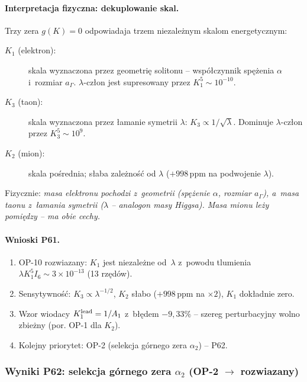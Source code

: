 \paragraph{Interpretacja fizyczna: dekuplowanie skal.}
Trzy zera $g(K)=0$ odpowiadaja trzem niezale\.znym skalom energetycznym:
\begin{description}
  \item[$K_1$ (elektron):] skala wyznaczona przez geometri\k{e} solitonu --
    wsp\'o\l{}czynnik sp\k{e}\.zenia $\alpha$ i~rozmiar $a_\Gamma$.
    $\lambda$-cz\l{}on jest supresowany przez $K_1^5\sim10^{-10}$.
  \item[$K_3$ (taon):] skala wyznaczona przez \l{}amanie symetrii $\lambda$:
    $K_3\propto1/\sqrt{\lambda}$.
    Dominuje $\lambda$-cz\l{}on przez $K_3^5\sim10^9$.
  \item[$K_2$ (mion):] skala po\'srednia;
    s\l{}aba zale\.zno\'s\'c od $\lambda$ ($+998\,\mathrm{ppm}$ na
    podwojenie $\lambda$).
\end{description}
Fizycznie: \emph{masa elektronu pochodzi z~geometrii (sp\k{e}\.zenie
$\alpha$, rozmiar $a_\Gamma$), a~masa taonu z~\l{}amania symetrii
($\lambda$ -- analogon masy Higgsa).
Masa mionu le\.zy pomi\k{e}dzy -- ma obie cechy.}

\paragraph{Wnioski P61.}
\begin{enumerate}
  \item OP-10 rozwiazany: $K_1$ jest niezale\.zne od~$\lambda$
        z~powodu tlumienia $\lambda K_1^5 I_6 \sim 3\times10^{-13}$
        (13 rz\k{e}d\'ow).
  \item Sensytywno\'s\'c: $K_3\propto\lambda^{-1/2}$,
        $K_2$ s\l{}abo ($+998\,\mathrm{ppm}$ na $\times2$),
        $K_1$ dok\l{}adnie zero.
  \item Wzor wiodacy $K_1^{\rm lead}=1/A_1$ z~b\l{}\k{e}dem $-9{,}33\%$ --
        szereg perturbacyjny wolno zbie\.zny (por. OP-1 dla $K_2$).
  \item Kolejny priorytet: OP-2 (selekcja g\'ornego zera $\alpha_2$) -- P62.
\end{enumerate}

\subsubsection{Wyniki P62: selekcja g\'ornego zera $\alpha_2$ (OP-2 $\to$ rozwiazany)}%
\label{app:F-P62}


